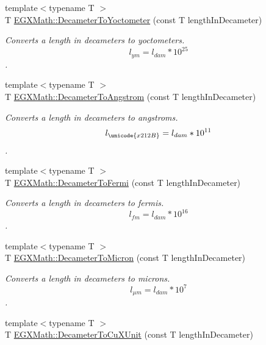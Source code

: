 \begin{DoxyCompactItemize}
{\footnotesize template$<$typename T $>$ }\\T \mbox{\hyperlink{group___e_g_x_math-_conversions-_length_conversions-_s_i-_decameter-_s_i_ga1e90c34b56ee230eec4a3e00a3fedbde}{E\+G\+X\+Math\+::\+Decameter\+To\+Yoctometer}} (const T length\+In\+Decameter)
\begin{DoxyCompactList}\small\item\em Converts a length in decameters to yoctometers. \[ l_{ym}=l_{dam} * 10^{25} \]. \end{DoxyCompactList}\item 
{\footnotesize template$<$typename T $>$ }\\T \mbox{\hyperlink{group___e_g_x_math-_conversions-_length_conversions-_s_i-_decameter-_non-_s_i_ga2ea722ea1c773432c2680fe6ebd67638}{E\+G\+X\+Math\+::\+Decameter\+To\+Angstrom}} (const T length\+In\+Decameter)
\begin{DoxyCompactList}\small\item\em Converts a length in decameters to angstroms. \[ l_{\unicode{x212B}}=l_{dam} * 10^{11} \]. \end{DoxyCompactList}\item 
{\footnotesize template$<$typename T $>$ }\\T \mbox{\hyperlink{group___e_g_x_math-_conversions-_length_conversions-_s_i-_decameter-_non-_s_i_gadc348f062b782f64f13784377f032f9b}{E\+G\+X\+Math\+::\+Decameter\+To\+Fermi}} (const T length\+In\+Decameter)
\begin{DoxyCompactList}\small\item\em Converts a length in decameters to fermis. \[ l_{fm}=l_{dam} * 10^{16} \]. \end{DoxyCompactList}\item 
{\footnotesize template$<$typename T $>$ }\\T \mbox{\hyperlink{group___e_g_x_math-_conversions-_length_conversions-_s_i-_decameter-_non-_s_i_gaf3c7befd051b823dc17aca5318cae689}{E\+G\+X\+Math\+::\+Decameter\+To\+Micron}} (const T length\+In\+Decameter)
\begin{DoxyCompactList}\small\item\em Converts a length in decameters to microns. \[ l_{\mu m}=l_{dam} * 10^{7} \]. \end{DoxyCompactList}\item 
{\footnotesize template$<$typename T $>$ }\\T \mbox{\hyperlink{group___e_g_x_math-_conversions-_length_conversions-_s_i-_decameter-_non-_s_i_gaf256500ca4f0b7a62018ea61078c29e3}{E\+G\+X\+Math\+::\+Decameter\+To\+Cu\+X\+Unit}} (const T length\+In\+Decameter)

\end{DoxyCompactItemize}

